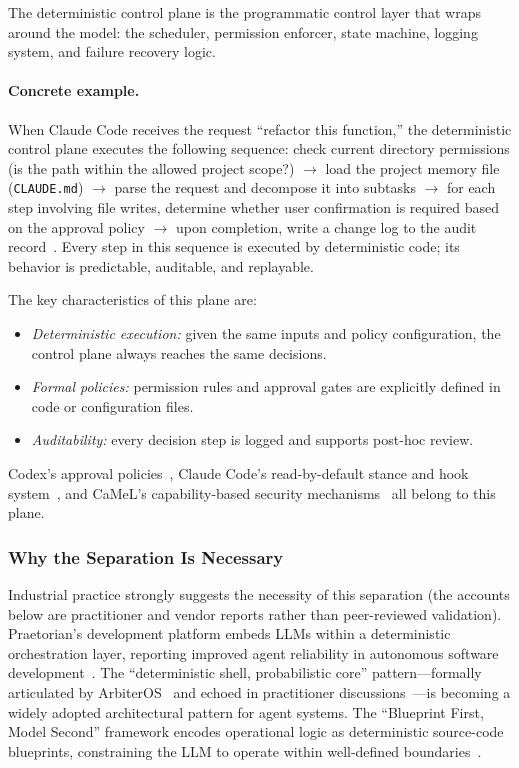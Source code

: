 The deterministic control plane is the programmatic control layer that wraps around the model: the scheduler, permission enforcer, state machine, logging system, and failure recovery logic.

\paragraph{Concrete example.}
When Claude Code receives the request ``refactor this function,'' the deterministic control plane executes the following sequence: check current directory permissions (is the path within the allowed project scope?) $\to$ load the project memory file (\texttt{CLAUDE.md}) $\to$ parse the request and decompose it into subtasks $\to$ for each step involving file writes, determine whether user confirmation is required based on the approval policy $\to$ upon completion, write a change log to the audit record~\cite{anthropic_claudecode_security_2026}.
Every step in this sequence is executed by deterministic code; its behavior is predictable, auditable, and replayable.

The key characteristics of this plane are:
\begin{itemize}[nosep]
\item \textit{Deterministic execution:} given the same inputs and policy configuration, the control plane always reaches the same decisions.
\item \textit{Formal policies:} permission rules and approval gates are explicitly defined in code or configuration files.
\item \textit{Auditability:} every decision step is logged and supports post-hoc review.
\end{itemize}

Codex's approval policies~\cite{openai_codex_approvals_2026}, Claude Code's read-by-default stance and hook system~\cite{anthropic_claudecode_security_2026}, and CaMeL's capability-based security mechanisms~\cite{debenedetti2025camel} all belong to this plane.

\subsubsection{Why the Separation Is Necessary}

Industrial practice strongly suggests the necessity of this separation (the accounts below are practitioner and vendor reports rather than peer-reviewed validation).
Praetorian's development platform embeds LLMs within a deterministic orchestration layer, reporting improved agent reliability in autonomous software development~\cite{praetorian2025deterministic}.
The ``deterministic shell, probabilistic core'' pattern---formally articulated by ArbiterOS~\cite{arbiteros2025} and echoed in practitioner discussions~\cite{towardsai2025deterministicshell}---is becoming a widely adopted architectural pattern for agent systems.
The ``Blueprint First, Model Second'' framework encodes operational logic as deterministic source-code blueprints, constraining the LLM to operate within well-defined boundaries~\cite{blueprintfirst2025}.


